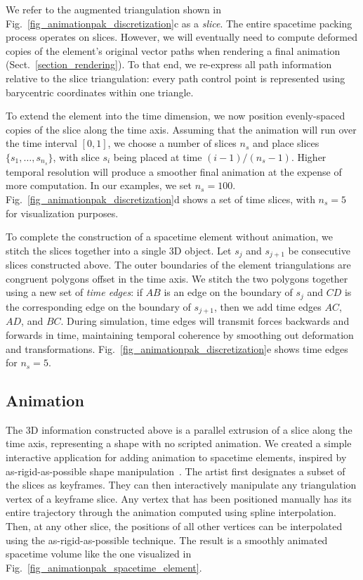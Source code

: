We refer to the augmented triangulation shown in 
Fig.~\ref{fig_animationpak_discretization}c as a \textit{slice}.  
The entire spacetime packing process operates on slices.  
However, we will eventually
need to compute deformed copies of the element's original vector paths 
when rendering a final animation (Sect.~\ref{section_rendering}).
To that end, we re-express all path information relative to the
slice triangulation: every path control point is represented using
barycentric coordinates within one triangle.

To extend the element into the time dimension, 
we now position evenly-spaced copies of the slice along the time axis.
Assuming that the animation will run over the time interval $[0,1]$, 
we choose a number of slices $n_s$ and place slices $\{s_1,\ldots,s_{n_s}\}$,
with slice $s_i$ being placed at time $(i-1)/(n_s-1)$.
Higher temporal resolution will
produce a smoother final animation at the expense of more computation.
In our examples, we set $n_s=100$. 
Fig.~\ref{fig_animationpak_discretization}d shows a set of time slices, with
$n_s=5$ for visualization purposes.

To complete the construction of a spacetime element without animation,
we stitch the slices together into a single 3D object.  Let $s_j$ and
$s_{j+1}$ be consecutive slices constructed above.  The outer boundaries
of the element triangulations are congruent polygons offset in the time 
axis.  We stitch the two polygons together using a new set of 
\textit{time edges}: if $AB$ is an edge on the boundary of $s_j$ and
$CD$ is the corresponding edge on the boundary of $s_{j+1}$, then
we add time edges $AC$, $AD$, and $BC$.
During simulation, time edges will transmit forces backwards and forwards in
time, maintaining temporal coherence by smoothing out deformation and 
transformations.
Fig.~\ref{fig_animationpak_discretization}e shows time edges for $n_s=5$.


\subsection{Animation}
\label{animationpak_animation}

The 3D information constructed above is a parallel extrusion of a 
slice along the time axis, representing a shape with no scripted animation.
We created a simple interactive application for adding animation to
spacetime elements, inspired by as-rigid-as-possible shape
manipulation~\cite{Igarashi2005}.  The artist first designates a subset
of the slices as keyframes.  They can then interactively manipulate
any triangulation vertex of a keyframe slice.  Any vertex that has
been positioned manually has its entire trajectory through the animation
computed using spline interpolation.  Then, at any other slice, the positions
of all other vertices can be interpolated using the as-rigid-as-possible
technique.  The result is a smoothly animated spacetime volume like the one
visualized in Fig.~\ref{fig_animationpak_spacetime_element}.

